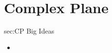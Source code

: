 \chapter{Complex Plane}
\label{chap:CP}

\begin{bigideas}{sec:CP Big Ideas}
\begin{itemize}
  \item 
\end{itemize}
\end{bigideas}